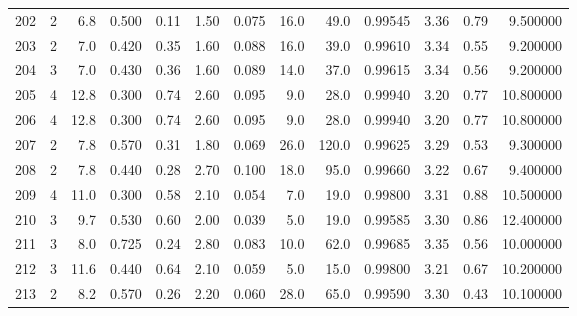 \begin{tabular}{lrrrrrrrrrrrr}
202  &        2 &            6.8 &             0.500 &         0.11 &            1.50 &      0.075 &                 16.0 &                  49.0 &  0.99545 &  3.36 &       0.79 &   9.500000 \\
203  &        2 &            7.0 &             0.420 &         0.35 &            1.60 &      0.088 &                 16.0 &                  39.0 &  0.99610 &  3.34 &       0.55 &   9.200000 \\
204  &        3 &            7.0 &             0.430 &         0.36 &            1.60 &      0.089 &                 14.0 &                  37.0 &  0.99615 &  3.34 &       0.56 &   9.200000 \\
205  &        4 &           12.8 &             0.300 &         0.74 &            2.60 &      0.095 &                  9.0 &                  28.0 &  0.99940 &  3.20 &       0.77 &  10.800000 \\
206  &        4 &           12.8 &             0.300 &         0.74 &            2.60 &      0.095 &                  9.0 &                  28.0 &  0.99940 &  3.20 &       0.77 &  10.800000 \\
207  &        2 &            7.8 &             0.570 &         0.31 &            1.80 &      0.069 &                 26.0 &                 120.0 &  0.99625 &  3.29 &       0.53 &   9.300000 \\
208  &        2 &            7.8 &             0.440 &         0.28 &            2.70 &      0.100 &                 18.0 &                  95.0 &  0.99660 &  3.22 &       0.67 &   9.400000 \\
209  &        4 &           11.0 &             0.300 &         0.58 &            2.10 &      0.054 &                  7.0 &                  19.0 &  0.99800 &  3.31 &       0.88 &  10.500000 \\
210  &        3 &            9.7 &             0.530 &         0.60 &            2.00 &      0.039 &                  5.0 &                  19.0 &  0.99585 &  3.30 &       0.86 &  12.400000 \\
211  &        3 &            8.0 &             0.725 &         0.24 &            2.80 &      0.083 &                 10.0 &                  62.0 &  0.99685 &  3.35 &       0.56 &  10.000000 \\
212  &        3 &           11.6 &             0.440 &         0.64 &            2.10 &      0.059 &                  5.0 &                  15.0 &  0.99800 &  3.21 &       0.67 &  10.200000 \\
213  &        2 &            8.2 &             0.570 &         0.26 &            2.20 &      0.060 &                 28.0 &                  65.0 &  0.99590 &  3.30 &       0.43 &  10.100000 \\

\end{tabular}
